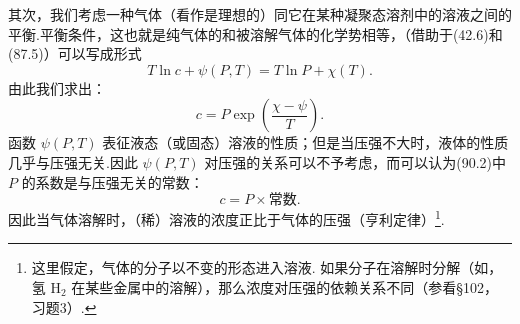 其次，我们考虑一种气体（看作是理想的）同它在某种凝聚态溶剂中的溶液之间的平衡.平衡条件，这也就是纯气体的和被溶解气体的化学势相等，（借助于(42.6)和(87.5)）可以写成形式
\begin{equation*}
  T\ln c+\psi(P,T)=T\ln P+\chi(T).
\end{equation*}
由此我们求出：
\begin{equation}
  c=P\exp\left(\frac{\chi-\psi}{T}\right).
\end{equation}
函数 $\psi(P,T)$ 表征液态（或固态）溶液的性质；但是当压强不大时，液体的性质几乎与压强无关.因此 $\psi(P,T)$ 对压强的关系可以不予考虑，而可以认为(90.2)中 $P$ 的系数是与压强无关的常数：
\begin{equation}
  c=P\times\text{常数}.
\end{equation}
因此当气体溶解时，（稀）溶液的浓度正比于气体的压强（亨利定律）\footnote{这里假定，气体的分子以不变的形态进入溶液. 如果分子在溶解时分解（如，氢 $\mathrm{H}_2$ 在某些金属中的溶解），那么浓度对压强的依赖关系不同（参看§102，习题3）.}.

